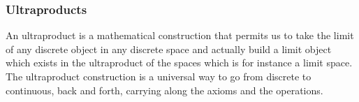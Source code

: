 \subsubsection*{Ultraproducts}
An ultraproduct is a mathematical construction that permits us to take the limit of any discrete object in any discrete space and actually build a limit object which exists in the ultraproduct of the spaces which is for instance a limit space. The ultraproduct construction is a universal way to go from discrete to continuous, back and forth, carrying along the axioms and the operations.



